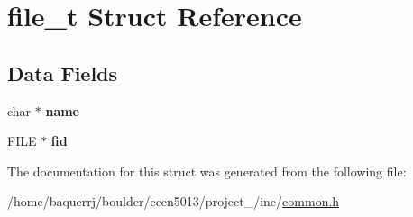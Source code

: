 \hypertarget{structfile__t}{}\section{file\+\_\+t Struct Reference}
\label{structfile__t}
\subsection*{Data Fields}
\begin{DoxyCompactItemize}
\item 
\mbox{\label{structfile__t_ab8a1f64f31b4df2b1a358810b762d85d}} 
char $\ast$ {\bfseries name}
\item 
\mbox{\label{structfile__t_a42bbe395fb009cbd336689aedcfcacad}} 
F\+I\+LE $\ast$ {\bfseries fid}
\end{DoxyCompactItemize}


The documentation for this struct was generated from the following file\+:\begin{DoxyCompactItemize}
\item 
/home/baquerrj/boulder/ecen5013/project\+\_/inc/\hyperlink{common_8h}{common.\+h}\end{DoxyCompactItemize}
